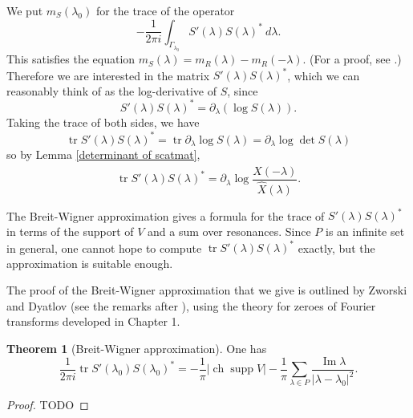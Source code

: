 \documentclass[12pt]{report}
\DeclareMathOperator{\ch}{ch}
\DeclareMathOperator{\supp}{supp}
\renewcommand{\Im}{\operatorname{Im}}
\newcommand{\tr}{\operatorname{tr}}
\theoremstyle{definition}
\newtheorem{theorem}{Theorem}[chapter]
\begin{document}
We put $m_S(\lambda_0)$ for the trace of the operator
$$-\frac{1}{2\pi i} \int_{\Gamma_{\lambda_0}} S'(\lambda)S(\lambda)^* ~d\lambda.$$
This satisfies the equation $m_S(\lambda) = m_R(\lambda) - m_R(-\lambda)$. (For a proof, see \cite[Theorem 2.14]{dyatlov2019mathematical}.) Therefore we are interested in the matrix $S'(\lambda)S(\lambda)^*$, which we can reasonably think of as the log-derivative of $S$, since
$$S'(\lambda)S(\lambda)^* = \partial_\lambda(\log S(\lambda)).$$
Taking the trace of both sides, we have
$$
  \tr S'(\lambda)S(\lambda)^* = \tr \partial_\lambda \log S(\lambda)
  = \partial_\lambda \log \det S(\lambda)
$$
so by Lemma \ref{determinant of scatmat},
\begin{equation}
\label{trace of log derivative}
\tr S'(\lambda)S(\lambda)^* = \partial_\lambda \log \frac{\hat X(-\lambda)}{\hat X(\lambda)}.
\end{equation}

The Breit-Wigner approximation gives a formula for the trace of $S'(\lambda)S(\lambda)^*$ in terms of the support of $V$ and a sum over resonances. Since $P$ is an infinite set in general, one cannot hope to compute $\tr S'(\lambda)S(\lambda)^*$ exactly, but the approximation is suitable enough.

The proof of the Breit-Wigner approximation that we give is outlined by Zworski and Dyatlov (see the remarks after \cite[Theorem 2.20]{dyatlov2019mathematical}), using the theory for zeroes of Fourier transforms developed in Chapter 1.

\begin{theorem}[Breit-Wigner approximation]
One has
$$\frac{1}{2\pi i} \tr S'(\lambda_0)S(\lambda_0)^* = -\frac{1}{\pi}|\ch\supp V| - \frac{1}{\pi}\sum_{\lambda \in P} \frac{\Im \lambda}{|\lambda - \lambda_0|^2}.$$
\end{theorem}

\begin{proof}
  TODO
\end{proof}
\end{document}
